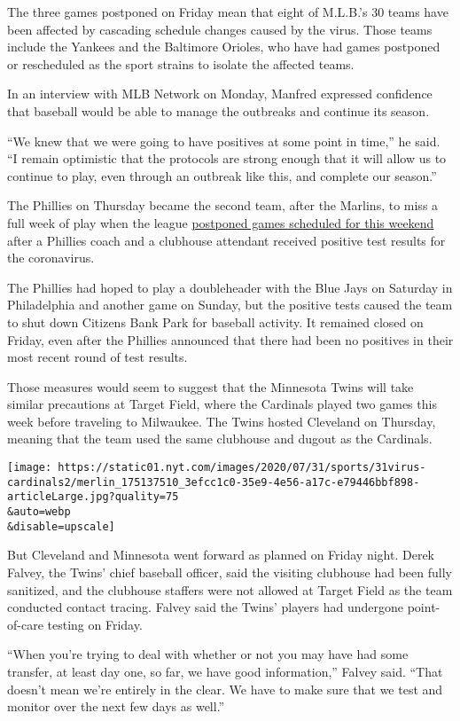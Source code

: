 The three games postponed on Friday mean that eight of M.L.B.'s 30 teams
have been affected by cascading schedule changes caused by the virus.
Those teams include the Yankees and the Baltimore Orioles, who have had
games postponed or rescheduled as the sport strains to isolate the
affected teams.

In an interview with MLB Network on Monday, Manfred expressed confidence
that baseball would be able to manage the outbreaks and continue its
season.

``We knew that we were going to have positives at some point in time,''
he said. ``I remain optimistic that the protocols are strong enough that
it will allow us to continue to play, even through an outbreak like
this, and complete our season.''

The Phillies on Thursday became the second team, after the Marlins, to
miss a full week of play when the league
\href{https://www.nytimes.com/2020/07/30/sports/baseball/phillies-blue-jays-postponed-coronavirus.html}{postponed
games scheduled for this weekend} after a Phillies coach and a clubhouse
attendant received positive test results for the coronavirus.

The Phillies had hoped to play a doubleheader with the Blue Jays on
Saturday in Philadelphia and another game on Sunday, but the positive
tests caused the team to shut down Citizens Bank Park for baseball
activity. It remained closed on Friday, even after the Phillies
announced that there had been no positives in their most recent round of
test results.

Those measures would seem to suggest that the Minnesota Twins will take
similar precautions at Target Field, where the Cardinals played two
games this week before traveling to Milwaukee. The Twins hosted
Cleveland on Thursday, meaning that the team used the same clubhouse and
dugout as the Cardinals.

\texttt{[image: https://static01.nyt.com/images/2020/07/31/sports/31virus-cardinals2/merlin\_175137510\_3efcc1c0-35e9-4e56-a17c-e79446bbf898-articleLarge.jpg?quality=75\\\&auto=webp\\\&disable=upscale]}

But Cleveland and Minnesota went forward as planned on Friday night.
Derek Falvey, the Twins' chief baseball officer, said the visiting
clubhouse had been fully sanitized, and the clubhouse staffers were not
allowed at Target Field as the team conducted contact tracing. Falvey
said the Twins' players had undergone point-of-care testing on Friday.

``When you're trying to deal with whether or not you may have had some
transfer, at least day one, so far, we have good information,'' Falvey
said. ``That doesn't mean we're entirely in the clear. We have to make
sure that we test and monitor over the next few days as well.''

